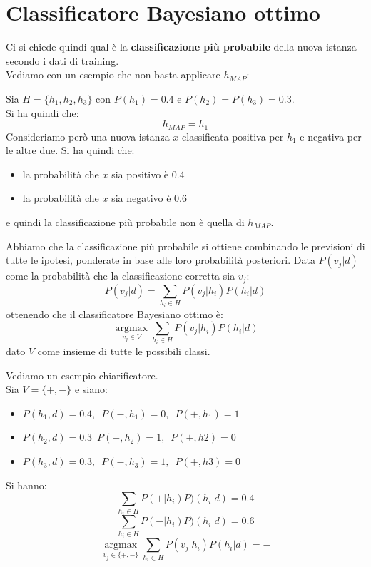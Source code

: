 \section{Classificatore Bayesiano ottimo}
Ci si chiede quindi qual è la \textbf{classificazione più probabile} della nuova istanza
secondo i dati di training.\\
Vediamo con un esempio che non basta applicare $h_{MAP}$:
\begin{esempio}
  Sia $H=\{h_1, h_2, h_3\}$ con $P(h_1)=0.4$ e $P(h_2)=P(h_3)=0.3$.\\
  Si ha quindi che:
  \[h_{MAP}=h_1\]
  Consideriamo però una nuova istanza $x$ classificata positiva per $h_1$ e
  negativa per le altre due. Si ha quindi che:
  \begin{itemize}
    \item la probabilità che $x$ sia positivo è 0.4
    \item la probabilità che $x$ sia negativo è 0.6
  \end{itemize}
  e quindi la classificazione più probabile non è quella di $h_{MAP}$.
\end{esempio}
Abbiamo che la classificazione più probabile si ottiene combinando le previsioni
di tutte le ipotesi, ponderate in base alle loro probabilità posteriori. Data
$P(v_j|d)$ come la probabilità che la classificazione corretta sia $v_j$:
\[P(v_j|d)=\sum_{h_i\in H}P(v_j|h_i)P(h_i|d)\]
ottenendo che il classificatore Bayesiano ottimo è:
\[\operatorname*{argmax}_{v_j\in V}\sum_{h_i\in H}P(v_j|h_i)P(h_i|d)\]
dato $V$ come insieme di tutte le possibili classi.
\begin{esempio}
  Vediamo un esempio chiarificatore.\\
  Sia $V=\{+,-\}$ e siano:
  \begin{itemize}
    \item $P(h_1, d) =0.4,\,\,\, P(-, h_1) = 0,\,\,\, P(+, h_1) = 1$
    \item $P(h_2, d) =0.3\,\,\, P(-, h_2) = 1,\,\,\, P(+, h2) = 0$
    \item $P(h_3, d) =0.3,\,\,\, P(-, h_3) = 1,\,\,\, P(+, h3) = 0$
  \end{itemize}
  Si hanno:
  \[\sum_{h_i\in H}P(+|h_i)P)(h_i|d)=0.4\]
  \[\sum_{h_i\in H}P(-|h_i)P)(h_i|d)=0.6\]
  \[\operatorname*{argmax}_{v_j\in \{+,-\}}\sum_{h_i\in H}P(v_j|h_i)P(h_i|d)=-\]
\end{esempio}
